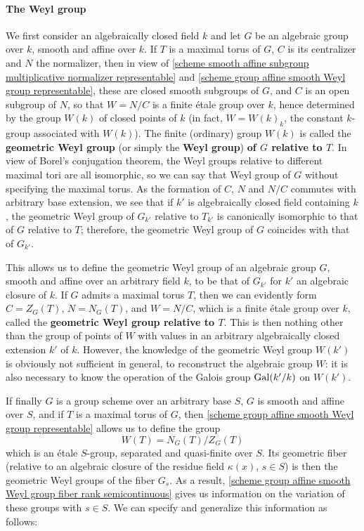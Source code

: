 \paragraph{The Weyl group}
We first consider an algebraically closed field $k$ and let $G$ be an algebraic group over $k$, smooth and affine over $k$. If $T$ is a maximal torus of $G$, $C$ is its centralizer and $N$ the normalizer, then in view of \cref{scheme smooth affine subgroup multiplicative normalizer representable} and \cref{scheme group affine smooth Weyl group representable}, these are closed smooth subgroups of $G$, and $C$ is an open subgroup of $N$, so that $W=N/C$ is a finite \'etale group over $k$, hence determined by the group $W(k)$ of closed points of $k$ (in fact, $W=W(k)_k$, the constant $k$-group associated with $W(k)$). The finite (ordinary) group $W(k)$ is called the \textbf{geometric Weyl group} (or simply the \textbf{Weyl group}) \textbf{of $G$ relative to $T$}. In view of Borel's conjugation theorem, the Weyl groups relative to different maximal tori are all isomorphic, so we can say that Weyl group of $G$ without specifying the maximal torus. As the formation of $C$, $N$ and $N/C$ commutes with arbitrary base extension, we see that if $k'$ is algebraically closed field containing $k$, the geometric Weyl group of $G_{k'}$ relative to $T_{k'}$ is canonically isomorphic to that of $G$ relative to $T$; therefore, the geometric Weyl group of $G$ coincides with that of $G_{k'}$.\par
This allows us to define the geometric Weyl group of an algebraic group $G$, smooth and affine over an arbitrary field $k$, to be that of $G_{k'}$ for $k'$ an algebraic closure of $k$. If $G$ admits a maximal torus $T$, then we can evidently form $C=Z_G(T)$, $N=N_G(T)$, and $W=N/C$, which is a finite \'etale group over $k$, called the \textbf{geometric Weyl group relative to $T$}. This is then nothing other than the group of points of $W$ with values in an arbitrary algebraically closed extension $k'$ of $k$. However, the knowledge of the geometric Weyl group $W(k')$ is obviously not sufficient in general, to reconstruct the algebraic group $W$: it is also necessary to know the operation of the Galois group $\mathrm{Gal}(k'/k)$ on $W(k')$.\par
If finally $G$ is a group scheme over an arbitrary base $S$, $G$ is smooth and affine over $S$, and if $T$ is a maximal torus of $G$, then \cref{scheme group affine smooth Weyl group representable} allows us to define the group
\[W(T)=N_G(T)/Z_G(T)\]
which is an \'etale $S$-group, separated and quasi-finite over $S$. Its geometric fiber (relative to an algebraic closure of the residue field $\kappa(x)$, $s\in S$) is then the geometric Weyl groups of the fiber $G_s$. As a result, \cref{scheme group affine smooth Weyl group fiber rank semicontinuous} gives us information on the variation of these groups with $s\in S$. We can specify and generalize this information as follows:

